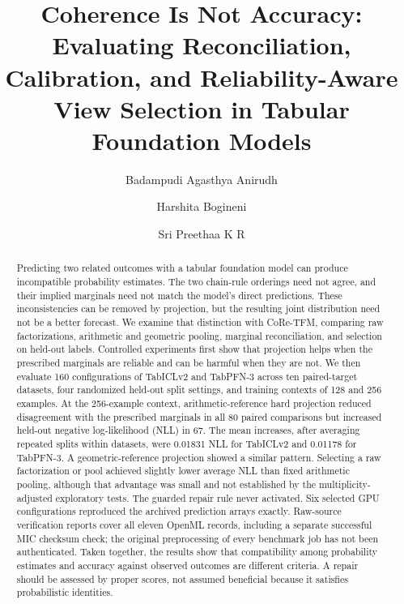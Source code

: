 \documentclass[a4paper,fleqn]{cas-sc}
\begin{document}
\title[mode=title]{Coherence Is Not Accuracy: Evaluating Reconciliation, Calibration, and Reliability-Aware View Selection in Tabular Foundation Models}

\author[vit]{Badampudi Agasthya Anirudh}
\author[vit]{Harshita Bogineni}
\author[vit]{Sri Preethaa K R}
\cormark[1]

\begin{abstract}
Predicting two related outcomes with a tabular foundation model can produce incompatible probability estimates. The two chain-rule orderings need not agree, and their implied marginals need not match the model's direct predictions. These inconsistencies can be removed by projection, but the resulting joint distribution need not be a better forecast. We examine that distinction with CoRe-TFM, comparing raw factorizations, arithmetic and geometric pooling, marginal reconciliation, and selection on held-out labels. Controlled experiments first show that projection helps when the prescribed marginals are reliable and can be harmful when they are not. We then evaluate 160 configurations of TabICLv2 and TabPFN-3 across ten paired-target datasets, four randomized held-out split settings, and training contexts of 128 and 256 examples. At the 256-example context, arithmetic-reference hard projection reduced disagreement with the prescribed marginals in all 80 paired comparisons but increased held-out negative log-likelihood (NLL) in 67. The mean increases, after averaging repeated splits within datasets, were 0.01831 NLL for TabICLv2 and 0.01178 for TabPFN-3. A geometric-reference projection showed a similar pattern. Selecting a raw factorization or pool achieved slightly lower average NLL than fixed arithmetic pooling, although that advantage was small and not established by the multiplicity-adjusted exploratory tests. The guarded repair rule never activated. Six selected GPU configurations reproduced the archived prediction arrays exactly. Raw-source verification reports cover all eleven OpenML records, including a separate successful MIC checksum check; the original preprocessing of every benchmark job has not been authenticated. Taken together, the results show that compatibility among probability estimates and accuracy against observed outcomes are different criteria. A repair should be assessed by proper scores, not assumed beneficial because it satisfies probabilistic identities.
\end{abstract}
\end{document}
